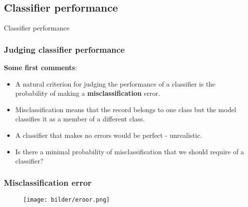 \documentclass{beamer}
\begin{document}
\subsection{Classifier performance}

\begin{frame}
	\begin{center}
		\Large{\textcolor{dkblue}{Classifier performance }}
	\end{center}
\end{frame}








\begin{frame}
\frametitle{Judging classifier performance}
\textbf{Some first comments}:\\
\begin{itemize}
  \item A natural criterion for judging the performance of a classifier is the probability
of making a \textbf{misclassification} error.
\vspace{0.2cm}
\item Misclassification means that the record
belongs to one class but the model classifies it as a member of a different class.
\vspace{0.2cm}
\item A classifier that makes no errors would be perfect - unrealistic.
\vspace{0.2cm}
\item Is there a minimal
probability of misclassification that we should require of a classifier?
\end{itemize}
\end{frame}


\begin{frame}
\frametitle{Misclassification error}
\begin{figure}
	\centering
	\texttt{[image: bilder/eroor.png]}
\end{figure}
\end{frame}
\end{document}
